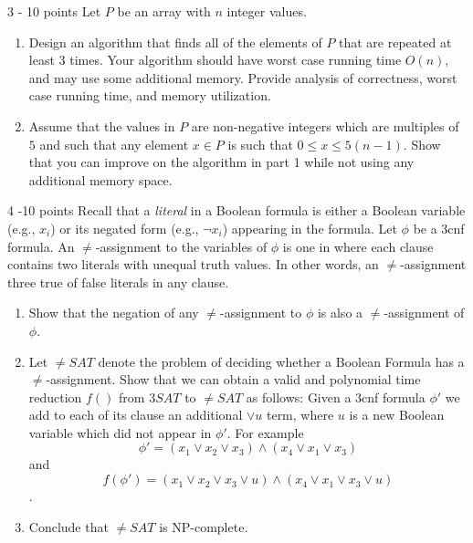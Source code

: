 \documentclass{common/cs157}
\begin{document}
\newpage

\begin{problem}{3 - 10 points}
Let $P$ be an array with $n$ integer values.
\begin{enumerate}
    \item Design an algorithm that finds all of the elements of $P$ that are repeated at least 3 times. Your algorithm should have worst case running time $O(n)$, and may use some additional memory. Provide analysis of correctness, worst case running time, and memory utilization.
    \item Assume that the values in $P$ are non-negative integers which are multiples of $5$ and such that any element $x\in P$ is such that $0\leq x\leq 5(n-1)$. Show that you can improve on the algorithm in part 1 while not using any additional memory space. 
\end{enumerate}
\end{problem}
\newpage

\begin{problem}{4 -10 points}
Recall that a \emph{literal} in a Boolean formula is either a Boolean variable (e.g., $x_i$) or its negated form (e.g., $\neg x_i$) appearing in the formula. Let $\phi$ be a 3cnf formula. An $\neq$-assignment to the variables of $\phi$ is one in where each clause contains two literals with unequal truth values. In other words, an $\neq$-assignment three true of false literals in any clause.
\begin{enumerate}
    \item Show that the negation of any $\neq$-assignment to $\phi$ is also a $\neq$-assignment of $\phi$.
    \item Let $\neq SAT$ denote the problem of deciding whether a Boolean Formula has a $\neq$-assignment. Show that we can obtain a valid and polynomial time reduction $f()$ from $3SAT$ to  $\neq SAT$ as follows: Given a 3cnf formula $\phi'$ we add to each of its clause an additional $\vee u$ term, where $u$ is a new Boolean variable which did not appear in $\phi'$. For example 
    $$\phi'=(x_1\vee x_2 \vee x_3)\wedge (x_4\vee x_1\vee x_3)$$
    and 
    $$f(\phi')= (x_1\vee x_2 \vee x_3\vee u)\wedge (x_4\vee x_1\vee x_3\vee u)$$.
    \item Conclude that $\neq SAT$ is NP-complete.
\end{enumerate}
 \end{problem}
\end{document}
